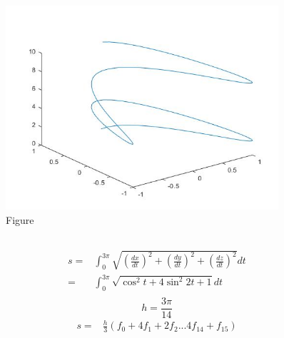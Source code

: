 \documentclass{article}
\begin{document}
    \section{}
        \subsection{}
            \paragraph{}
            
            \begin{figure}[H] 
                \centering 
                \includegraphics[width=0.9\textwidth]{img/Assignement_6_2.jpg}
                \caption{Figure} 
            \end{figure}
        \subsection{}
            \paragraph{}
            \begin{equation*}
                \begin{split}
                    s=&\int_0^{3\pi}\sqrt{(\frac{dx}{dt})^2+(\frac{dy}{dt})^2+(\frac{dz}{dt})^2}dt\\
                        =&\int_0^{3\pi}\sqrt{\cos^2 t+4\sin^2 2t+1}dt\\
                \end{split}
            \end{equation*}
            $$h=\frac{3\pi}{14}$$
            \begin{equation*}
                \begin{split}
                    s=&\frac{h}{3}(f_0+4f_1+2f_2...4f_{14}+f_{15})\\
                \end{split}
            \end{equation*}
            
            
\end{document}
